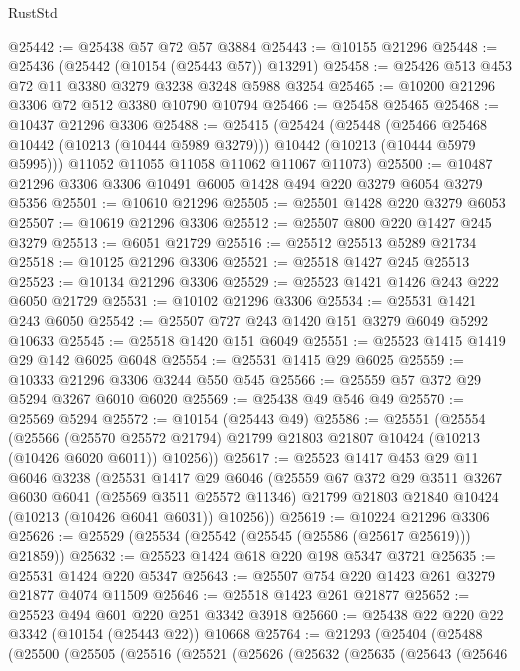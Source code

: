 \begin{lexlean}{RustStd}
\begin{coremodule}
@25442 := @25438 @57 @72 @57 @3884
@25443 := @10155 @21296
@25448 := @25436 (@25442 (@10154 (@25443 @57)) @13291)
@25458 := @25426 @513 @453 @72 @11 @3380 @3279 @3238 @3248 @5988 @3254
@25465 := @10200 @21296 @3306 @72 @512 @3380 @10790 @10794
@25466 := @25458 @25465
@25468 := @10437 @21296 @3306
@25488 := @25415
    (@25424
      (@25448
        (@25466 @25468 @10442 (@10213 (@10444 @5989 @3279)))
        @10442
        (@10213 (@10444 @5979 @5995)))
      @11052
      @11055
      @11058
      @11062
      @11067
      @11073)
@25500 := @10487 @21296 @3306 @3306 @10491 @6005 @1428 @494 @220 @3279 @6054 @3279 @5356
@25501 := @10610 @21296
@25505 := @25501 @1428 @220 @3279 @6053
@25507 := @10619 @21296 @3306
@25512 := @25507 @800 @220 @1427 @245 @3279
@25513 := @6051 @21729
@25516 := @25512 @25513 @5289 @21734
@25518 := @10125 @21296 @3306
@25521 := @25518 @1427 @245 @25513
@25523 := @10134 @21296 @3306
@25529 := @25523 @1421 @1426 @243 @222 @6050 @21729
@25531 := @10102 @21296 @3306
@25534 := @25531 @1421 @243 @6050
@25542 := @25507 @727 @243 @1420 @151 @3279 @6049 @5292 @10633
@25545 := @25518 @1420 @151 @6049
@25551 := @25523 @1415 @1419 @29 @142 @6025 @6048
@25554 := @25531 @1415 @29 @6025
@25559 := @10333 @21296 @3306 @3244 @550 @545
@25566 := @25559 @57 @372 @29 @5294 @3267 @6010 @6020
@25569 := @25438 @49 @546 @49
@25570 := @25569 @5294
@25572 := @10154 (@25443 @49)
@25586 := @25551
    (@25554
      (@25566
        (@25570 @25572 @21794)
        @21799
        @21803
        @21807
        @10424
        (@10213 (@10426 @6020 @6011))
        @10256))
@25617 := @25523
    @1417
    @453
    @29
    @11
    @6046
    @3238
    (@25531
      @1417
      @29
      @6046
      (@25559
        @67
        @372
        @29
        @3511
        @3267
        @6030
        @6041
        (@25569 @3511 @25572 @11346)
        @21799
        @21803
        @21840
        @10424
        (@10213 (@10426 @6041 @6031))
        @10256))
@25619 := @10224 @21296 @3306
@25626 := @25529 (@25534 (@25542 (@25545 (@25586 (@25617 @25619))) @21859))
@25632 := @25523 @1424 @618 @220 @198 @5347 @3721
@25635 := @25531 @1424 @220 @5347
@25643 := @25507 @754 @220 @1423 @261 @3279 @21877 @4074 @11509
@25646 := @25518 @1423 @261 @21877
@25652 := @25523 @494 @601 @220 @251 @3342 @3918
@25660 := @25438 @22 @220 @22 @3342 (@10154 (@25443 @22)) @10668
@25764 := @21293
    (@25404
      (@25488
        (@25500
          (@25505
            (@25516
              (@25521
                (@25626
                  (@25632
                    (@25635
                      (@25643
                        (@25646

\end{coremodule}
\end{lexlean}
